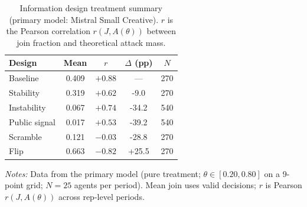 \begin{table}[t]
\centering
\caption{Information design treatment summary (primary model: Mistral Small Creative). $r$ is the Pearson correlation $r(J, A(\theta))$ between join fraction and theoretical attack mass.}
\label{tab:infodesign_summary}
\small
\begin{tabular}{lcccc}
\toprule
Design & Mean & $r$ & $\Delta$ (pp) & $N$ \\
\midrule
Baseline & 0.409 & $+0.88$ & --- & 270 \\
Stability & 0.319 & $+0.62$ & -9.0 & 270 \\
Instability & 0.067 & $+0.74$ & -34.2 & 540 \\
Public signal & 0.017 & $+0.53$ & -39.2 & 540 \\
Scramble & 0.121 & $-0.03$ & -28.8 & 270 \\
Flip & 0.663 & $-0.82$ & +25.5 & 270 \\
\bottomrule
\end{tabular}
\vspace{0.25em}
\parbox{\columnwidth}{\footnotesize\emph{Notes:} Data from the primary model (pure treatment; $\theta \in [0.20, 0.80]$ on a 9-point grid; $N{=}25$ agents per period). Mean join uses valid decisions; $r$ is Pearson $r(J, A(\theta))$ across rep-level periods.}
\end{table}
